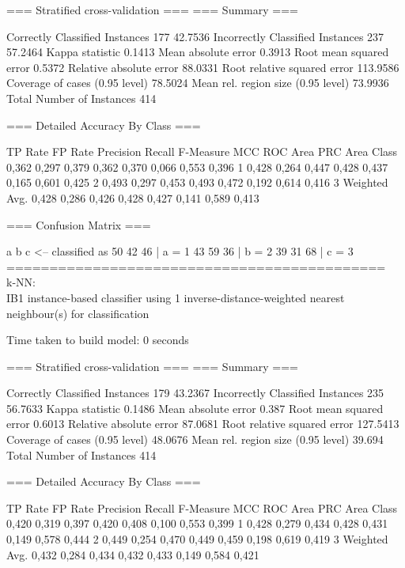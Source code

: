 \documentclass[12pt,a4paper,titlepage]{report}
\begin{document}
=== Stratified cross-validation ===
=== Summary ===

Correctly Classified Instances         177               42.7536 %
Incorrectly Classified Instances       237               57.2464 %
Kappa statistic                          0.1413
Mean absolute error                      0.3913
Root mean squared error                  0.5372
Relative absolute error                 88.0331 %
Root relative squared error            113.9586 %
Coverage of cases (0.95 level)          78.5024 %
Mean rel. region size (0.95 level)      73.9936 %
Total Number of Instances              414     

=== Detailed Accuracy By Class ===

                 TP Rate  FP Rate  Precision  Recall   F-Measure  MCC      ROC Area  PRC Area  Class
                 0,362    0,297    0,379      0,362    0,370      0,066    0,553     0,396     1
                 0,428    0,264    0,447      0,428    0,437      0,165    0,601     0,425     2
                 0,493    0,297    0,453      0,493    0,472      0,192    0,614     0,416     3
Weighted Avg.    0,428    0,286    0,426      0,428    0,427      0,141    0,589     0,413     

=== Confusion Matrix ===

  a  b  c   <-- classified as
 50 42 46 |  a = 1
 43 59 36 |  b = 2
 39 31 68 |  c = 3
 ============================================\\
k-NN:\\

IB1 instance-based classifier
using 1 inverse-distance-weighted nearest neighbour(s) for classification


Time taken to build model: 0 seconds

=== Stratified cross-validation ===
=== Summary ===

Correctly Classified Instances         179               43.2367 %
Incorrectly Classified Instances       235               56.7633 %
Kappa statistic                          0.1486
Mean absolute error                      0.387 
Root mean squared error                  0.6013
Relative absolute error                 87.0681 %
Root relative squared error            127.5413 %
Coverage of cases (0.95 level)          48.0676 %
Mean rel. region size (0.95 level)      39.694  %
Total Number of Instances              414     

=== Detailed Accuracy By Class ===

                 TP Rate  FP Rate  Precision  Recall   F-Measure  MCC      ROC Area  PRC Area  Class
                 0,420    0,319    0,397      0,420    0,408      0,100    0,553     0,399     1
                 0,428    0,279    0,434      0,428    0,431      0,149    0,578     0,444     2
                 0,449    0,254    0,470      0,449    0,459      0,198    0,619     0,419     3
Weighted Avg.    0,432    0,284    0,434      0,432    0,433      0,149    0,584     0,421     
\end{document}
